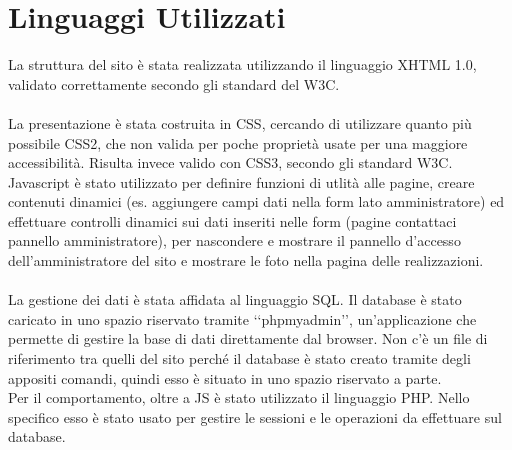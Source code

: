 \section{Linguaggi Utilizzati}{
	La struttura del sito è stata realizzata utilizzando il linguaggio XHTML 1.0, validato correttamente secondo gli standard del W3C. \\
	\\
	La presentazione è stata costruita in CSS, cercando di utilizzare quanto più possibile CSS2, che non valida per poche proprietà usate per una maggiore accessibilità. Risulta invece valido con CSS3, secondo gli standard W3C.
	\\
	Javascript è stato utilizzato per definire funzioni di utlità alle pagine, creare contenuti dinamici (es. aggiungere campi dati nella form lato amministratore) ed effettuare controlli dinamici sui dati inseriti nelle form (pagine contattaci pannello amministratore), per nascondere e mostrare il pannello d'accesso dell'amministratore del sito e mostrare le foto nella pagina delle realizzazioni.\\
	\\
	La gestione dei dati è stata affidata al linguaggio SQL. Il database è stato caricato in uno spazio riservato tramite ‘‘phpmyadmin’’, un'applicazione che permette di gestire la base di dati direttamente dal browser. Non c'è un file di riferimento tra quelli del sito perché il database è stato creato tramite degli appositi comandi, quindi esso è situato in uno spazio riservato a parte.
	\\
	Per il comportamento, oltre a JS è stato utilizzato il linguaggio PHP. Nello specifico esso è stato usato per gestire le sessioni e le operazioni da effettuare sul database.
	\\
}